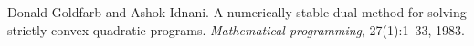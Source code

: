 
\begin{DoxyDescription}
\item[\label{_CITEREF_goldfarb1983numerically}%
\mbox{[}1\mbox{]}]Donald Goldfarb and Ashok Idnani. A numerically stable dual method for solving strictly convex quadratic programs. {\itshape Mathematical programming}, 27(1)\+:1--33, 1983.


\end{DoxyDescription}